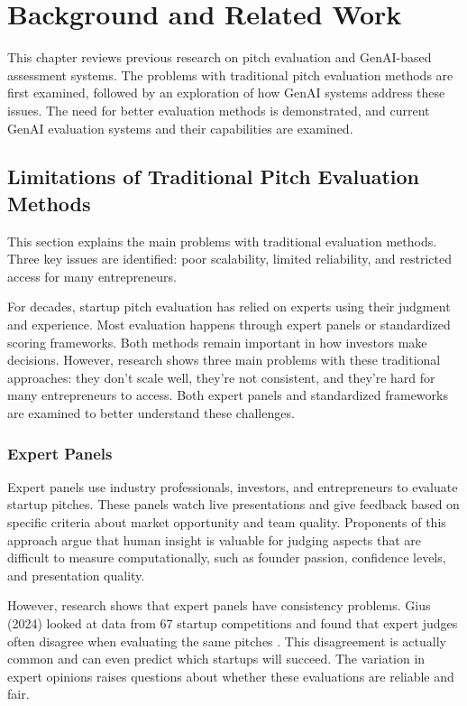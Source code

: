 \chapter{Background and Related Work}
\label{ch:soa}
This chapter reviews previous research on pitch evaluation and GenAI-based assessment systems. The problems with traditional pitch evaluation methods are first examined, followed by an exploration of how GenAI systems address these issues. The need for better evaluation methods is demonstrated, and current GenAI evaluation systems and their capabilities are examined.

\section{Limitations of Traditional Pitch Evaluation Methods}
\label{sec:traditional-methods}

This section explains the main problems with traditional evaluation methods. Three key issues are identified: poor scalability, limited reliability, and restricted access for many entrepreneurs.

For decades, startup pitch evaluation has relied on experts using their judgment and experience. Most evaluation happens through expert panels or standardized scoring frameworks. Both methods remain important in how investors make decisions. However, research shows three main problems with these traditional approaches: they don't scale well, they're not consistent, and they're hard for many entrepreneurs to access. Both expert panels and standardized frameworks are examined to better understand these challenges.

\subsection{Expert Panels}\label{subsec:expert-panels}
Expert panels use industry professionals, investors, and entrepreneurs to evaluate startup pitches. These panels watch live presentations and give feedback based on specific criteria about market opportunity and team quality. Proponents of this approach argue that human insight is valuable for judging aspects that are difficult to measure computationally, such as founder passion, confidence levels, and presentation quality.

However, research shows that expert panels have consistency problems. Gius (2024) looked at data from 67 startup competitions and found that expert judges often disagree when evaluating the same pitches \cite{Gius2024}. This disagreement is actually common and can even predict which startups will succeed. The variation in expert opinions raises questions about whether these evaluations are reliable and fair.

